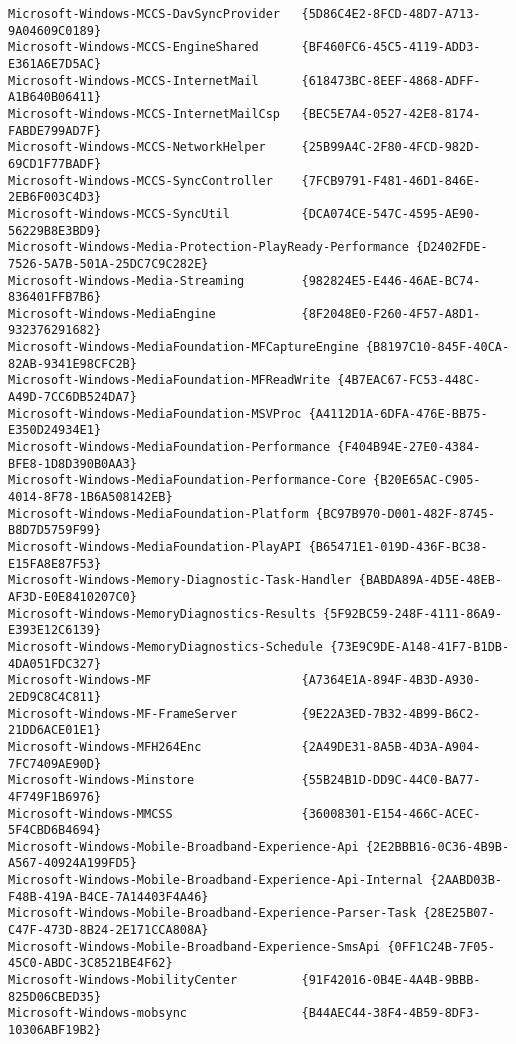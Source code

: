 \documentclass{report}
\begin{document}
\begin{lstlisting}[breaklines=true,basicstyle=\tiny]
Microsoft-Windows-MCCS-DavSyncProvider   {5D86C4E2-8FCD-48D7-A713-9A04609C0189}
Microsoft-Windows-MCCS-EngineShared      {BF460FC6-45C5-4119-ADD3-E361A6E7D5AC}
Microsoft-Windows-MCCS-InternetMail      {618473BC-8EEF-4868-ADFF-A1B640B06411}
Microsoft-Windows-MCCS-InternetMailCsp   {BEC5E7A4-0527-42E8-8174-FABDE799AD7F}
Microsoft-Windows-MCCS-NetworkHelper     {25B99A4C-2F80-4FCD-982D-69CD1F77BADF}
Microsoft-Windows-MCCS-SyncController    {7FCB9791-F481-46D1-846E-2EB6F003C4D3}
Microsoft-Windows-MCCS-SyncUtil          {DCA074CE-547C-4595-AE90-56229B8E3BD9}
Microsoft-Windows-Media-Protection-PlayReady-Performance {D2402FDE-7526-5A7B-501A-25DC7C9C282E}
Microsoft-Windows-Media-Streaming        {982824E5-E446-46AE-BC74-836401FFB7B6}
Microsoft-Windows-MediaEngine            {8F2048E0-F260-4F57-A8D1-932376291682}
Microsoft-Windows-MediaFoundation-MFCaptureEngine {B8197C10-845F-40CA-82AB-9341E98CFC2B}
Microsoft-Windows-MediaFoundation-MFReadWrite {4B7EAC67-FC53-448C-A49D-7CC6DB524DA7}
Microsoft-Windows-MediaFoundation-MSVProc {A4112D1A-6DFA-476E-BB75-E350D24934E1}
Microsoft-Windows-MediaFoundation-Performance {F404B94E-27E0-4384-BFE8-1D8D390B0AA3}
Microsoft-Windows-MediaFoundation-Performance-Core {B20E65AC-C905-4014-8F78-1B6A508142EB}
Microsoft-Windows-MediaFoundation-Platform {BC97B970-D001-482F-8745-B8D7D5759F99}
Microsoft-Windows-MediaFoundation-PlayAPI {B65471E1-019D-436F-BC38-E15FA8E87F53}
Microsoft-Windows-Memory-Diagnostic-Task-Handler {BABDA89A-4D5E-48EB-AF3D-E0E8410207C0}
Microsoft-Windows-MemoryDiagnostics-Results {5F92BC59-248F-4111-86A9-E393E12C6139}
Microsoft-Windows-MemoryDiagnostics-Schedule {73E9C9DE-A148-41F7-B1DB-4DA051FDC327}
Microsoft-Windows-MF                     {A7364E1A-894F-4B3D-A930-2ED9C8C4C811}
Microsoft-Windows-MF-FrameServer         {9E22A3ED-7B32-4B99-B6C2-21DD6ACE01E1}
Microsoft-Windows-MFH264Enc              {2A49DE31-8A5B-4D3A-A904-7FC7409AE90D}
Microsoft-Windows-Minstore               {55B24B1D-DD9C-44C0-BA77-4F749F1B6976}
Microsoft-Windows-MMCSS                  {36008301-E154-466C-ACEC-5F4CBD6B4694}
Microsoft-Windows-Mobile-Broadband-Experience-Api {2E2BBB16-0C36-4B9B-A567-40924A199FD5}
Microsoft-Windows-Mobile-Broadband-Experience-Api-Internal {2AABD03B-F48B-419A-B4CE-7A14403F4A46}
Microsoft-Windows-Mobile-Broadband-Experience-Parser-Task {28E25B07-C47F-473D-8B24-2E171CCA808A}
Microsoft-Windows-Mobile-Broadband-Experience-SmsApi {0FF1C24B-7F05-45C0-ABDC-3C8521BE4F62}
Microsoft-Windows-MobilityCenter         {91F42016-0B4E-4A4B-9BBB-825D06CBED35}
Microsoft-Windows-mobsync                {B44AEC44-38F4-4B59-8DF3-10306ABF19B2}

\end{lstlisting}
\end{document}
